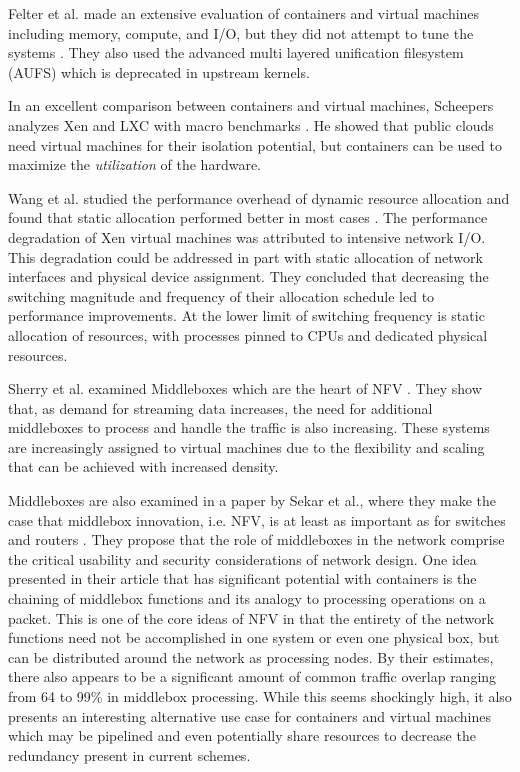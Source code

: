 Felter et al. made an extensive evaluation of containers and virtual machines including memory, compute, and I/O, but they did not attempt to tune the systems \autocite{_felter_1}.
They also used the advanced multi layered unification filesystem (AUFS) which is deprecated in upstream kernels.

In an excellent comparison between containers and virtual machines, Scheepers analyzes Xen and LXC with macro benchmarks \autocite{_scheepers_1}.  
He showed that public clouds need virtual machines for their isolation potential, but containers can be used to maximize the \emph{utilization} of the hardware.

Wang et al. studied the performance overhead of dynamic resource allocation and found that static allocation performed better in most cases \autocite{wangAllocation2007}.
The performance degradation of Xen virtual machines was attributed to intensive network I/O.
This degradation could be addressed in part with static allocation of network interfaces and physical device assignment.
They concluded that decreasing the switching magnitude and frequency of their allocation schedule led to performance improvements.
At the lower limit of switching frequency is static allocation of resources, with processes pinned to CPUs and dedicated physical resources.

Sherry et al. examined Middleboxes which are the heart of NFV \autocite{sherry2012making}.
They show that, as demand for streaming data increases, the need for additional middleboxes to process and handle the traffic is also increasing.
These systems are increasingly assigned to virtual machines due to the flexibility and scaling that can be achieved with increased density.

Middleboxes are also examined in a paper by Sekar et al., where they make the case that middlebox innovation, i.e. NFV, is at least as important as for switches and routers \autocite{sekar2011middlebox}.
They propose that the role of middleboxes in the network comprise the critical usability and security considerations of network design.
One idea presented in their article that has significant potential with containers is the chaining of middlebox functions and its analogy to processing operations on a packet.  
This is one of the core ideas of NFV in that the entirety of the network functions need not be accomplished in one system or even one physical box, but can be distributed around the network as processing nodes.  
By their estimates, there also appears to be a significant amount of common traffic overlap ranging from 64 to 99\% in middlebox processing. 
While this seems shockingly high, it also presents an interesting alternative use case for containers and virtual machines which may be pipelined and even potentially share resources to decrease the redundancy present in current schemes.

